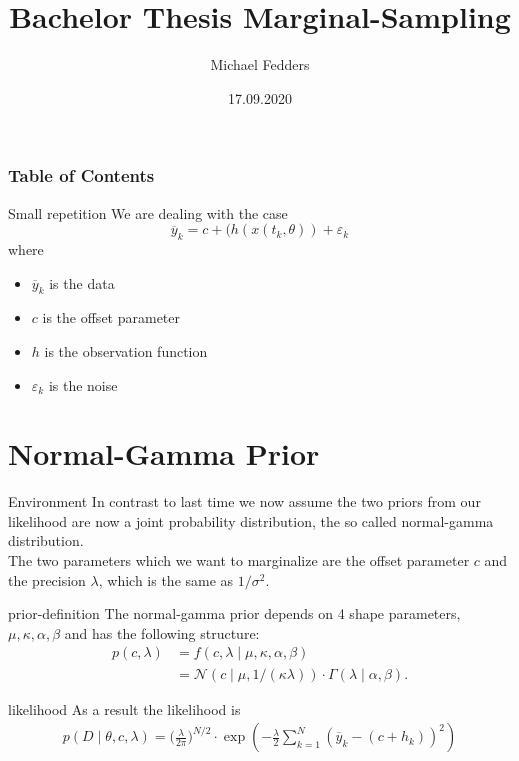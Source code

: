 \documentclass{beamer}
\title{Bachelor Thesis Marginal-Sampling}
\date{17.09.2020}
\author{Michael Fedders}
\newcommand{\s}{\sigma^2}
\newcommand{\y}{\overline{y}}
\begin{document}
	\maketitle
  	\begin{frame}[plain]
		\frametitle{Table of Contents}
		\tableofcontents
	\end{frame}
	
	\begin{frame}{Small repetition}
		We are dealing with the case 
		\[
		\overline{y}_{k} = c + (h(x(t_k,\theta)) + \varepsilon_{k}
  		\]
  		where
  		\begin{itemize}
  		\item $\y_k$ is the data
  		\item $c$ is the offset parameter
  		\item $h$ is the observation function
  		\item $\varepsilon_k$ is the noise
  		\end{itemize}
	\end{frame}		
	
	
	
\section{Normal-Gamma Prior}

	\begin{frame}{Environment}
		In contrast to last time we now assume the two priors from our likelihood 			are now a joint probability distribution, the so called normal-gamma 				distribution. \\
		The two parameters which we want to marginalize are the offset parameter $c$ 		and the precision $\lambda$, which is the same as $1/\s$.
	\end{frame}
  	
  	\begin{frame}{prior-definition}
  		The normal-gamma prior depends on 4 shape parameters, $\mu, \kappa, 				\alpha, \beta$ and has the following structure:
  		\begin{align}
  			p(c, \lambda) &= f(c, \lambda \mid \mu, \kappa, \alpha, \beta) \\
  			&= \mathcal{N}(c \mid \mu, 1/(\kappa \lambda)) \cdot \Gamma(\lambda 				\mid \alpha, \beta).
  		\end{align}
  	\end{frame}
  	
  	\begin{frame}{likelihood}
  		As a result the likelihood is
  		\begin{align}
  			 p(D \mid \theta, c, \lambda) = \biggl(\frac{\lambda}{2\pi}\biggr)					^{N/2} \cdot \exp\left( - \frac{\lambda}{2} \sum_{k = 1}^N (\y_k - (c 				+ h_k))^2 \right)
  		\end{align}
  	\end{frame}
  	
\end{document}
